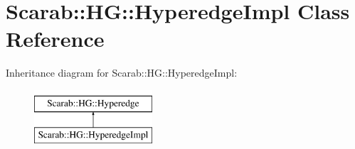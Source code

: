 \hypertarget{class_scarab_1_1_h_g_1_1_hyperedge_impl}{
\section{Scarab::HG::HyperedgeImpl Class Reference}
\label{class_scarab_1_1_h_g_1_1_hyperedge_impl}
}
Inheritance diagram for Scarab::HG::HyperedgeImpl:\begin{figure}[H]
\begin{center}
\leavevmode
\includegraphics[height=2cm]{class_scarab_1_1_h_g_1_1_hyperedge_impl}
\end{center}
\end{figure}

